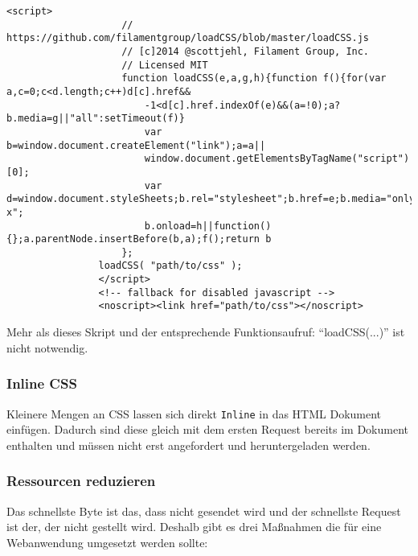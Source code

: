 				\begin{lstlisting}[captionpos=b, caption=Lädt eine CSS Datei asynchron, label=lst:deferCSS, breaklines=false]
				<script>
					// https://github.com/filamentgroup/loadCSS/blob/master/loadCSS.js
					// [c]2014 @scottjehl, Filament Group, Inc.
					// Licensed MIT
		 			function loadCSS(e,a,g,h){function f(){for(var a,c=0;c<d.length;c++)d[c].href&&
		 				-1<d[c].href.indexOf(e)&&(a=!0);a?b.media=g||"all":setTimeout(f)}
		 				var b=window.document.createElement("link");a=a||
		 				window.document.getElementsByTagName("script")[0];
		 				var d=window.document.styleSheets;b.rel="stylesheet";b.href=e;b.media="only x";
		 				b.onload=h||function(){};a.parentNode.insertBefore(b,a);f();return b
		 			};
		  		loadCSS( "path/to/css" );
				</script>
				<!-- fallback for disabled javascript -->
				<noscript><link href="path/to/css"></noscript>
				\end{lstlisting}

				Mehr als dieses Skript und der entsprechende Funktionsaufruf: "`loadCSS(...)"' ist nicht notwendig.
					

			\subsubsection{Inline CSS} %
			\label{ssub:inline_css}
				Kleinere Mengen an CSS lassen sich direkt \texttt{Inline} in das HTML Dokument einfügen. Dadurch sind diese gleich mit dem ersten Request bereits im Dokument enthalten und müssen nicht erst angefordert und heruntergeladen werden.

			\subsubsection{Ressourcen reduzieren} %
			\label{ssub:ressourcen_reduzieren}
				Das schnellste Byte ist das, dass nicht gesendet wird und der schnellste Request ist der, der nicht gestellt wird. Deshalb gibt es drei Maßnahmen die für eine Webanwendung umgesetzt werden sollte:

